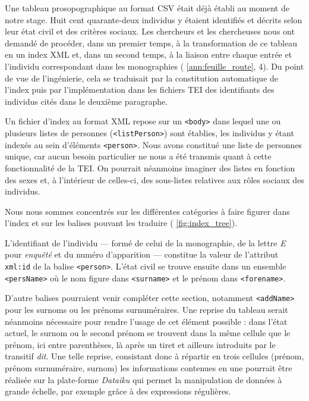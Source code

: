 Une tableau prosopographique au format CSV était déjà établi au moment de notre stage. Huit cent quarante-deux individus y étaient identifiés et décrits selon leur état civil et des critères sociaux. Les chercheurs et les chercheuses nous ont demandé de procéder, dans un premier temps, à la transformation de ce tableau en un  index XML et, dans un second temps, à la liaison entre chaque entrée et l'individu correspondant dans les monographies (\ann{} \ref{ann:feuille_route}, \issue{} 4). Du point de vue de l'ingénierie, cela se traduisait par la constitution automatique de l'index puis par l'implémentation dans les fichiers TEI des identifiants des individus cités dans le deuxième paragraphe.

Un fichier d'index au format XML repose sur un \texttt{<body>} dans lequel une ou plusieurs listes de personnes (\texttt{<listPerson>}) sont établies, les individus y étant indexés au sein d'éléments \texttt{<person>}. Nous avons constitué une liste de personnes unique, car aucun besoin particulier ne nous a été transmis quant à cette fonctionnalité de la TEI. On pourrait néanmoins imaginer des listes en fonction des sexes et, à l'intérieur de celles-ci, des sous-listes relatives aux rôles sociaux des individus. 

Nous nous sommes concentrés sur les différentes catégories à faire figurer dans l'index et sur les balises pouvant les traduire (\fig{} \ref{fig:index_tree}).

L'identifiant de l'individu --- formé de celui de la monographie, de la lettre \textit{E} pour \textit{enquêté} et du numéro d'apparition --- constitue la valeur de l'attribut \texttt{xml:id} de la balise \texttt{<person>}. L'état civil se trouve ensuite dans un ensemble \texttt{<persName>} où le nom figure dans \texttt{<surname>} et le prénom dans \texttt{<forename>}.

D'autre balises pourraient venir compléter cette section, notamment \texttt{<addName>} pour les surnoms ou les prénoms surnuméraires. Une reprise du tableau serait néanmoins nécessaire pour rendre l'usage de cet élément possible : dans l'état actuel, le surnom ou le second prénom se trouvent dans la même cellule que le prénom, ici entre parenthèses, là après un tiret et ailleurs introduits par le transitif \textit{dit}. Une telle reprise, consistant donc à répartir en trois cellules (prénom, prénom surnuméraire, surnom) les informations contenues en une pourrait être réalisée sur la plate-forme \textit{Dataiku} qui permet la manipulation de données à grande échelle, par exemple grâce à des expressions régulières.

